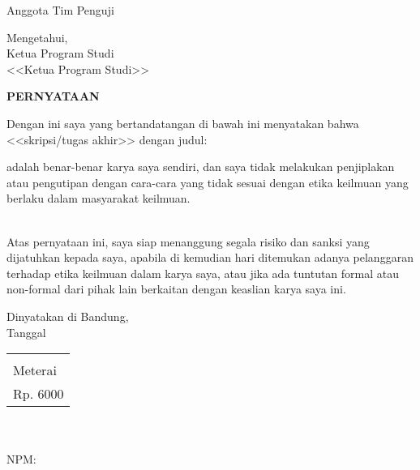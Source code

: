 \documentclass[11pt,a4paper,twoside,openright,notitlepage]{report}
\newcommand{\rtext}[1]{{\color{red} \small #1}}%
\newcommand{\vstaINA}{\rtext{<<SKRIPSI/TUGAS AKHIR>>}}
\newcommand{\vkaprodi}{\rtext{<<Ketua Program Studi>>}}
\begin{document}
{{{\begin{center}
{{\begin{center}
\begin{minipage}[b]{0.475\textwidth}
				\begin{center}Anggota Tim Penguji \\ \vspace{2.5cm} \vpengii\end{center} 
			\end{minipage} 
		\end{center}
		\vspace{0.75cm}
		\begin{center} 
		Mengetahui,\\ \vspace{0.5cm}	
		Ketua Program Studi \\ \vspace{2.5cm} \vkaprodi
		\end{center}
		}}			 
	\end{center}
	\cleardoublepage 
	
	\vspace*{4cm}
	\begin{center} 
		{\Large \textbf{PERNYATAAN}\\} \vspace{1cm}
	\end{center}
	{\noindent Dengan ini saya yang bertandatangan di bawah ini menyatakan bahwa \MakeLowercase{\vstaINA} dengan judul:  \vspace{0.5cm}
	\begin{center} {\large \textbf{\vjudulINA}}\end{center}
	\vspace{0.5cm}
	adalah benar-benar karya saya sendiri, dan saya tidak melakukan penjiplakan atau pengutipan dengan cara-cara yang tidak sesuai dengan etika keilmuan yang berlaku dalam masyarakat keilmuan.}
	\vspace{0pt}\\
	{\noindent			
	Atas pernyataan ini, saya siap menanggung segala risiko dan sanksi yang dijatuhkan kepada saya, apabila di kemudian hari ditemukan adanya pelanggaran terhadap etika keilmuan dalam karya saya, atau jika ada tuntutan formal atau non-formal dari pihak lain berkaitan dengan keaslian karya saya ini.\\}
	\vspace{0.25cm}
	
	\begin{flushright}	
		Dinyatakan di Bandung,\\
		Tanggal \vtanggal\ \vbulan\ \vtahun \\ \vspace{0.5cm}
		\begin{tabular}{|p{1.75cm}|}
			\hline\\ Meterai \\ Rp. 6000 \\  \hline
		\end{tabular}\\
		\vspace{0.5cm}   
		\vnama \\
		NPM: \vnpm
	\end{flushright}
	 \cleardoublepage 

}}}
\end{document}
